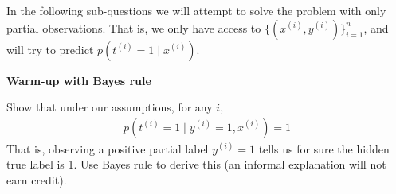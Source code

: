 \vspace{0.3in}
In the following sub-questions we will attempt to solve the problem with only partial observations. That is, we only have access to $\{(x^{(i)}, y^{(i)})\}_{i=1}^n$, and will try to predict $p(t^{(i)}=1 \mid x^{(i)})$.

\item {} \textbf{Warm-up with Bayes rule}

Show that under our assumptions, for any $i$, 
\begin{align}
p(t^{(i)}=1\mid y^{(i)} = 1, x^{(i)}) = 1
\end{align}
That is, observing a positive partial label $y^{(i)}=1$ tells us for sure the hidden true label is 1. Use Bayes rule to derive this (an informal explanation will not earn credit).

